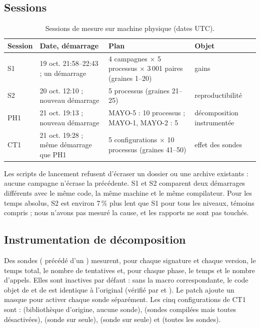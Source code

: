 \subsection{Sessions}
\begin{table}[ht]\centering\small
\caption{Sessions de mesure sur machine physique (dates UTC).}\label{tab:sessions}
\begin{tabularx}{\linewidth}{@{}lXXX@{}}\toprule
Session & Date, démarrage & Plan & Objet\\\midrule
S1 & 19 oct. 21:58--22:43 ; un démarrage & 4 campagnes $\times$ 5 processus $\times$ 3\,001 paires (graines 1--20) & gains\\
S2 & 20 oct. 12:10 ; nouveau démarrage & 5 processus (graines 21--25) & reproductibilité\\
PH1 & 21 oct. 19:13 ; nouveau démarrage & MAYO-5 : 10 processus ; MAYO-1, MAYO-2 : 5 & décomposition instrumentée\\
CT1 & 21 oct. 19:28 ; même démarrage que PH1 & 5 configurations $\times$ 10 processus (graines 41--50) & effet des sondes\\\bottomrule
\end{tabularx}
\end{table}
Les scripts de lancement refusent d'écraser un dossier ou une archive existants : aucune campagne n'écrase la précédente. S1 et S2 comparent deux démarrages différents avec le même code, la même machine et le même compilateur. Pour les temps absolus, S2 est environ 7\,\% plus lent que S1 pour tous les niveaux, témoins compris ; nous n'avons pas mesuré la cause, et les rapports ne sont pas touchés.

\subsection{Instrumentation de décomposition}
Des sondes ( précédé d'un ) mesurent, pour chaque signature et chaque version, le temps total, le nombre de tentatives et, pour chaque phase, le temps et le nombre d'appels. Elles sont inactives par défaut : sans la macro correspondante, le code objet de  et de  est identique à l'original (vérifié par  et ). Le patch  ajoute un masque pour activer chaque sonde séparément. Les cinq configurations de CT1 sont :  (bibliothèque d'origine, aucune sonde),  (sondes compilées mais toutes désactivées),  (sonde sur  seule),  (sonde sur  seule) et  (toutes les sondes).

